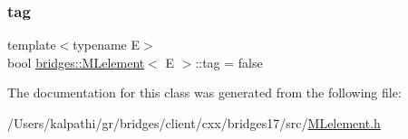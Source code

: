 \mbox{\label{classbridges_1_1_m_lelement_a0285a07355b2bc3d064c30e20aa2fd55}} 
\subsubsection{\texorpdfstring{tag}{tag}}
{\footnotesize\ttfamily template$<$typename E$>$ \\
bool \mbox{\hyperlink{classbridges_1_1_m_lelement}{bridges\+::\+M\+Lelement}}$<$ E $>$\+::tag = false\hspace{0.3cm}{\ttfamily [protected]}}



The documentation for this class was generated from the following file\+:\begin{DoxyCompactItemize}
\item 
/\+Users/kalpathi/gr/bridges/client/cxx/bridges17/src/\mbox{\hyperlink{_m_lelement_8h}{M\+Lelement.\+h}}\end{DoxyCompactItemize}

